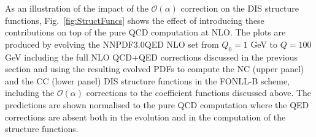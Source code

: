 As an illustration of the impact of the $\mathcal{O}(\alpha)$
correction on the DIS structure functions, Fig.~\ref{fig:StructFuncs}
shows the effect of introducing these contributions on top of the pure
QCD computation at NLO. The plots are produced by evolving the
NNPDF3.0QED NLO set from $Q_0=1$ GeV to $Q=100$ GeV including the full
NLO QCD+QED corrections discussed in the previous section and using
the resulting evolved PDFs to compute the NC (upper panel) and the CC
(lower panel) DIS structure functions in the FONLL-B scheme, including
the $\mathcal{O}(\alpha)$ corrections to the coefficient functions
discussed above. The predictions are shown normalised to the pure QCD
computation where the QED corrections are absent both in the evolution
and in the computation of the structure functions.


